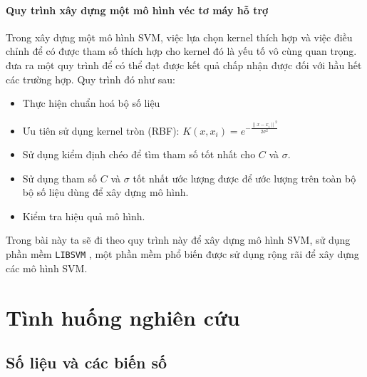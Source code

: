 \documentclass[a4paper]{report}\usepackage[]{graphicx}\usepackage[]{color}
\begin{document}
\subsubsection{Quy trình xây dựng một mô hình véc tơ máy hỗ trợ}

Trong xây dựng một mô hình SVM, việc lựa chọn kernel thích hợp và việc điều chỉnh để có được tham số thích hợp cho kernel đó là yếu tố vô cùng quan trọng. 
\textcite{hsu2003practical} đưa ra một quy trình để có thể đạt được kết quả chấp nhận được đối với hầu hết các trường hợp. Quy trình đó như sau:

\begin{itemize}
  \item Thực hiện chuẩn hoá bộ số liệu
  \item Ưu tiên sử dụng kernel tròn (RBF): $K(x, x_i) = e^{-\frac{{\|x - x_i\|}^2}{2 \sigma^2}}$
  \item Sử dụng kiểm định chéo để tìm tham số tốt nhất cho $C$ và $\sigma$.
  \item Sử dụng tham số $C$ và $\sigma$ tốt nhất ước lượng được để ước lượng trên toàn bộ bộ số liệu dùng để xây dựng mô hình.
  \item Kiểm tra hiệu quả mô hình.
\end{itemize}

Trong bài này ta sẽ đi theo quy trình này để xây dựng mô hình SVM, sử dụng phần mềm \texttt{LIBSVM} \textcite{CC01a}, một phần mềm phổ biến được sử dụng rộng rãi để xây dựng các mô hình SVM.


\chapter{Tình huống nghiên cứu}

\section{Số liệu và các biến số}
\end{document}
